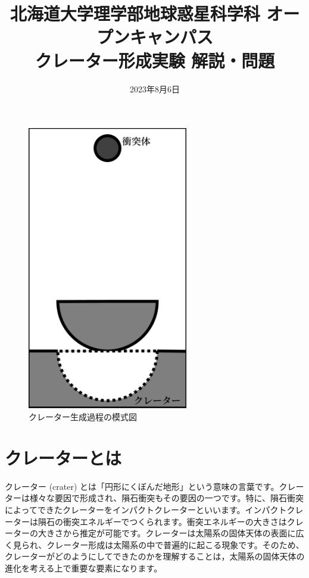 \documentclass[a4paper]{ltjsarticle}
\begin{document}
\title{北海道大学理学部地球惑星科学科 オープンキャンパス\\クレーター形成実験 解説・問題}
\date{2023年8月6日}
\maketitle
\thispagestyle{empty}

\begin{figure}
    \vspace{-8mm}
    \includegraphics[width=70mm,clip]{./figure/explanation_figure.pdf}
    \vspace{-6mm}
    \caption{クレーター生成過程の模式図}
\end{figure}
\section{クレーターとは}
クレーター (crater) とは「円形にくぼんだ地形」という意味の言葉です。クレーターは様々な要因で形成され、隕石衝突もその要因の一つです。特に、隕石衝突によってできたクレーターをインパクトクレーターといいます。インパクトクレーターは隕石の衝突エネルギーでつくられます。衝突エネルギーの大きさはクレーターの大きさから推定が可能です。クレーターは太陽系の固体天体の表面に広く見られ、クレーター形成は太陽系の中で普遍的に起こる現象です。そのため、クレーターがどのようにしてできたのかを理解することは，太陽系の固体天体の進化を考える上で重要な要素になります。
\end{document}
